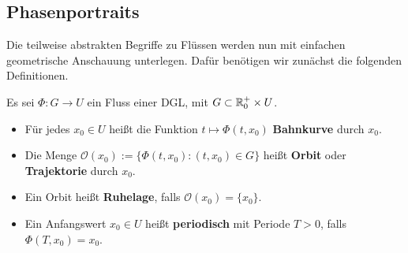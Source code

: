 \subsection{Phasenportraits}
\label{\detokenize{ode/fluesse:phasenportraits}}
Die teilweise abstrakten Begriffe zu Flüssen werden nun mit einfachen geometrische Anschauung unterlegen. Dafür benötigen wir zunächst die folgenden Definitionen.
\label{ode/fluesse:definition-5}
\begin{definition}{}{}



Es sei \(\Phi:G\rightarrow U\) ein Fluss einer DGL, mit \(G\subset \mathbb{R}^+_0\times U\).
\begin{itemize}
\item {} 
Für jedes \(x_0\in U\) heißt die Funktion \(t\mapsto \Phi(t, x_0)\) \textbf{Bahnkurve} durch \(x_0\).

\item {} 
Die Menge \(\mathcal{O}(x_0) := \{\Phi(t, x_0): (t, x_0)\in G\}\) heißt \textbf{Orbit} oder \textbf{Trajektorie} durch \(x_0\).

\item {} 
Ein Orbit heißt \textbf{Ruhelage}, falls \(\mathcal{O}(x_0) = \{x_0\}\).

\item {} 
Ein Anfangswert \(x_0\in U\) heißt \textbf{periodisch} mit Periode \(T>0\), falls \(\Phi(T, x_0) = x_0\).

\end{itemize}
\end{definition}
\label{ode/fluesse:example-6}
